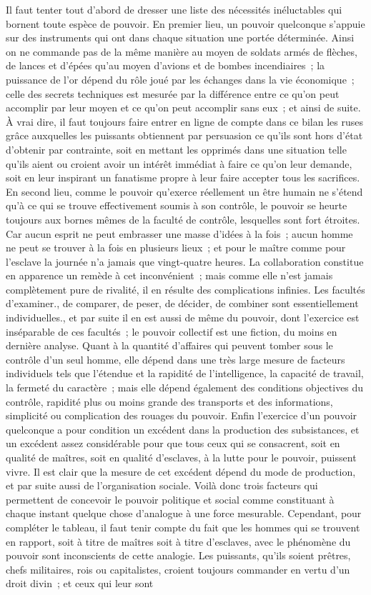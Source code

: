 \documentclass[french,twoside]{book} %
\begin{document}
Il faut tenter tout d'abord de dresser une liste des nécessités inéluctables qui bornent toute espèce de pouvoir. En premier lieu, un pouvoir quelconque s'appuie sur des instruments qui ont dans chaque situation une portée déterminée. Ainsi on ne commande pas de la même manière au moyen de soldats armés de flèches, de lances et d'épées qu'au moyen d'avions et de bombes incendiaires ; la puissance de l'or dépend du rôle joué par les échanges dans la vie économique ; celle des secrets techniques est mesurée par la différence entre ce qu'on peut accomplir par leur moyen et ce qu'on peut accomplir sans eux ; et ainsi de suite. À vrai dire, il faut toujours faire entrer en ligne de compte dans ce bilan les ruses grâce auxquelles les puissants obtiennent par persuasion ce qu'ils sont hors d'état d'obtenir par contrainte, soit en mettant les opprimés dans une situation telle qu'ils aient ou croient avoir un intérêt immédiat à faire ce qu'on leur demande, soit en leur inspirant un fanatisme propre à leur faire accepter tous les sacrifices. En second lieu, comme le pouvoir qu'exerce réellement un être humain ne s'étend qu'à ce qui se trouve effectivement soumis à son contrôle, le pouvoir se heurte toujours aux bornes mêmes de la faculté de contrôle, lesquelles sont fort étroites. Car aucun esprit ne peut embrasser une masse d'idées à la fois ; aucun homme ne peut se trouver à la fois en plusieurs lieux ; et pour le maître comme pour l'esclave la journée n'a jamais que vingt-quatre heures. La collaboration constitue en apparence un remède à cet inconvénient ; mais comme elle n'est jamais complètement pure de rivalité, il en résulte des complications infinies. Les facultés d'examiner., de comparer, de peser, de décider, de combiner sont essentiellement individuelles., et par suite il en est aussi de même du pouvoir, dont l'exercice est inséparable de ces facultés ; le pouvoir collectif est une fiction, du moins en dernière analyse. Quant à la quantité d'affaires qui peuvent tomber sous le contrôle d'un seul homme, elle dépend dans une très large mesure de facteurs individuels tels que l'étendue et la rapidité de l'intelligence, la capacité de travail, la fermeté du caractère ; mais elle dépend également des conditions objectives du contrôle, rapidité plus ou moins grande des transports et des informations, simplicité ou complication des rouages du pouvoir. Enfin l’exercice d'un pouvoir quelconque a pour condition un excédent dans la production des subsistances, et un excédent assez considérable pour que tous ceux qui se consacrent, soit en qualité de maîtres, soit en qualité d'esclaves, à la lutte pour le pouvoir, puissent vivre. Il est clair que la mesure de cet excédent dépend du mode de production, et par suite aussi de l'organisation sociale. Voilà donc trois facteurs qui permettent de concevoir le pouvoir politique et social comme constituant à chaque instant quelque chose d'analogue à une force mesurable. Cependant, pour compléter le tableau, il faut tenir compte du fait que les hommes qui se trouvent en rapport, soit à titre de maîtres soit à titre d'esclaves, avec le phénomène du pouvoir sont inconscients de cette analogie. Les puissants, qu'ils soient prêtres, chefs militaires, rois ou capitalistes, croient toujours commander en vertu d'un droit divin ; et ceux qui leur sont 
\end{document}

